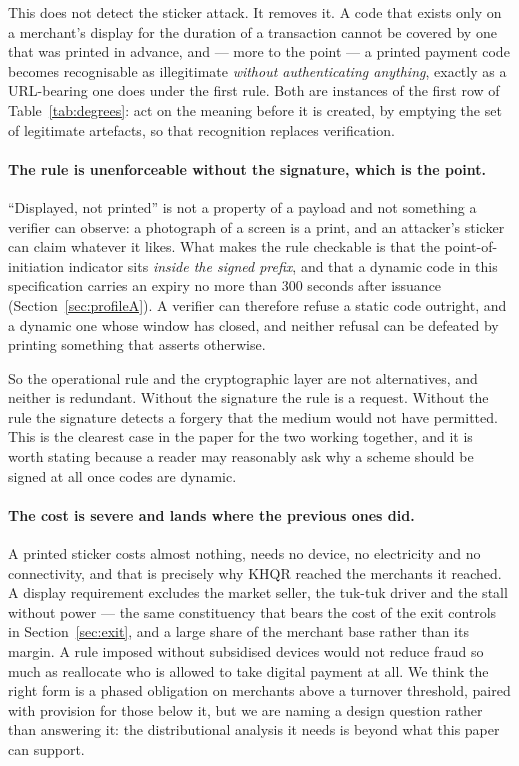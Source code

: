 \documentclass[10pt,a4paper,twocolumn]{article}
\begin{document}
This does not detect the sticker attack. It removes it. A code that exists only
on a merchant's display for the duration of a transaction cannot be covered by
one that was printed in advance, and --- more to the point --- a printed payment
code becomes recognisable as illegitimate \emph{without authenticating
anything}, exactly as a URL-bearing one does under the first rule. Both are
instances of the first row of Table~\ref{tab:degrees}: act on the meaning before
it is created, by emptying the set of legitimate artefacts, so that recognition
replaces verification.

\paragraph{The rule is unenforceable without the signature, which is the point.}
``Displayed, not printed'' is not a property of a payload and not something a
verifier can observe: a photograph of a screen is a print, and an attacker's
sticker can claim whatever it likes. What makes the rule checkable is that the
point-of-initiation indicator sits \emph{inside the signed prefix}, and that a
dynamic code in this specification carries an expiry no more than 300 seconds
after issuance (Section~\ref{sec:profileA}). A verifier can therefore refuse a
static code outright, and a dynamic one whose window has closed, and neither
refusal can be defeated by printing something that asserts otherwise.

So the operational rule and the cryptographic layer are not alternatives, and
neither is redundant. Without the signature the rule is a request. Without the
rule the signature detects a forgery that the medium would not have permitted.
This is the clearest case in the paper for the two working together, and it is
worth stating because a reader may reasonably ask why a scheme should be signed
at all once codes are dynamic.

\paragraph{The cost is severe and lands where the previous ones did.} A printed
sticker costs almost nothing, needs no device, no electricity and no
connectivity, and that is precisely why KHQR reached the merchants it reached. A
display requirement excludes the market seller, the tuk-tuk driver and the stall
without power --- the same constituency that bears the cost of the exit controls
in Section~\ref{sec:exit}, and a large share of the merchant base rather than
its margin. A rule imposed without subsidised devices would not reduce fraud so
much as reallocate who is allowed to take digital payment at all. We think the
right form is a phased obligation on merchants above a turnover threshold,
paired with provision for those below it, but we are naming a design question
rather than answering it: the distributional analysis it needs is beyond what
this paper can support.
\end{document}
